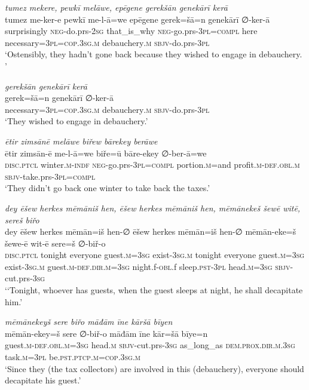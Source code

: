 \ea \label{BP.34}
\textit{tumez mekere, pewkī melāwe, epēgene gerekšān genekārī kerā} \\ 
\gll tumez me-ker-e pewkī me-l-ā=we epēgene gerek=šā=n genekārī ∅-ker-ā \\ 
 surprisingly \textsc{neg-}do.prs-\textsc{2sg} that\_is\_why \textsc{neg-}go.prs\textsc{-3pl}\textsc{=compl} here necessary\textsc{=3pl}\textsc{=cop}\textsc{.3sg}\textsc{.m} debauchery\textsc{.m} \textsc{sbjv-}do.prs\textsc{-3pl} \\ 
\glt `Ostensibly, they hadn’t gone back because they wished to engage in debauchery. '
\z 
 
\ea \label{BP.35}
\textit{gerekšān genekārī kerā} \\ 
\gll gerek=šā=n genekārī ∅-ker-ā \\ 
 necessary\textsc{=3pl}\textsc{=cop}\textsc{.3sg}\textsc{.m} debauchery\textsc{.m} \textsc{sbjv-}do.prs\textsc{-3pl} \\ 
\glt `They wished to engage in debauchery.'
\z 
 
\ea \label{BP.48}
\textit{ētir zimsānē melāwe biřew bārekey berāwe} \\ 
\gll ētir zimsān-ē me-l-ā=we biře=ū bāre-ekey ∅-ber-ā=we \\ 
 \textsc{disc.ptcl} winter\textsc{.m}\textsc{-indf} \textsc{neg-}go.prs\textsc{-3pl}\textsc{=compl} portion\textsc{.m}=and profit\textsc{.m}\textsc{-def}\textsc{.obl}\textsc{.m} \textsc{sbjv-}take.prs\textsc{-3pl}\textsc{=compl} \\ 
\glt `They didn’t go back one winter to take back the taxes.'
\z 
 
\ea \label{BP.52}
\textit{dey ēšew herkes mēmāniš hen, ēšew herkes mēmāniš hen, mēmānekeš šewē witē, sereš biřo} \\ 
\gll dey ēšew herkes mēmān=iš hen-∅ ēšew herkes mēmān=iš hen-∅ mēmān-eke=š šewe-ē wit-ē sere=š ∅-biř-o \\ 
 \textsc{disc.ptcl} tonight everyone guest\textsc{.m}\textsc{=3sg} exist\textsc{-3sg}\textsc{.m} tonight everyone guest\textsc{.m}\textsc{=3sg} exist\textsc{-3sg}\textsc{.m} guest\textsc{.m}\textsc{-def}\textsc{.dir}\textsc{.m}\textsc{=3sg} night.f\textsc{-obl}.f sleep\textsc{.pst}\textsc{-3pl} head\textsc{.m}\textsc{=3sg} \textsc{sbjv-}cut.prs\textsc{-3sg} \\ 
\glt `‘Tonight, whoever has guests, when the guest sleeps at night, he shall decapitate him.'
\z 
 
\ea \label{BP.53}
\textit{mēmānekeyš sere biřo māđām īne kāršā bīyen} \\ 
\gll mēmān-ekey=š sere ∅-biř-o māđām īne kār=šā bīye=n \\ 
 guest\textsc{.m}\textsc{-def}\textsc{.obl}\textsc{.m}\textsc{=3sg} head\textsc{.m} \textsc{sbjv-}cut.prs\textsc{-3sg} as\_long\_as \textsc{dem.prox}\textsc{.dir}\textsc{.m}\textsc{.3sg} task\textsc{.m}\textsc{=3pl} be\textsc{.pst}\textsc{.ptcp}\textsc{.m}\textsc{=cop}\textsc{.3sg}\textsc{.m} \\ 
\glt `Since they (the tax collectors) are involved in this (debauchery), everyone should decapitate his guest.'
\z 
 
